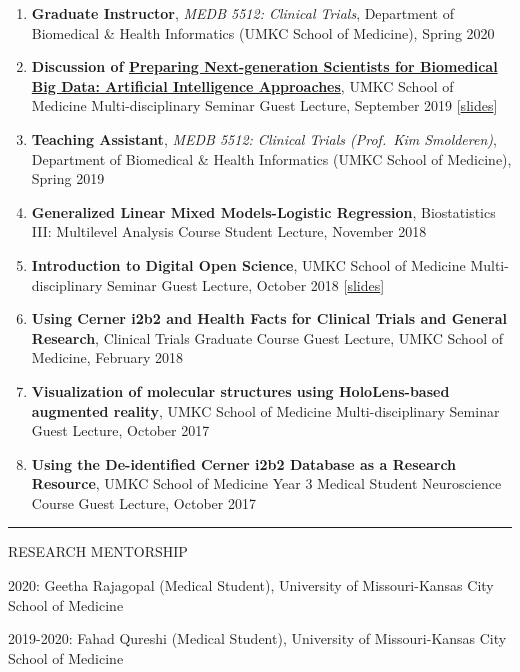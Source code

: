 \documentclass[
]{article}
\begin{document}
\begin{enumerate}
\def\labelenumi{\arabic{enumi}.}
\item
  \textbf{Graduate Instructor}, \emph{MEDB 5512: Clinical Trials},
  Department of Biomedical \& Health Informatics (UMKC School of
  Medicine), Spring 2020
\item
  \textbf{Discussion of
  \href{https://www.futuremedicine.com/doi/10.2217/pme-2018-0145}{Preparing
  Next-generation Scientists for Biomedical Big Data: Artificial
  Intelligence Approaches}}, UMKC School of Medicine Multi-disciplinary
  Seminar Guest Lecture, September 2019
  {[}\href{https://jeremyprovance.github.io/assets/2019-09-24_Slides.pdf}{slides}{]}
\item
  \textbf{Teaching Assistant}, \emph{MEDB 5512: Clinical Trials
  (Prof.~Kim Smolderen)}, Department of Biomedical \& Health Informatics
  (UMKC School of Medicine), Spring 2019
\item
  \textbf{Generalized Linear Mixed Models-Logistic Regression},
  Biostatistics III: Multilevel Analysis Course Student Lecture,
  November 2018
\item
  \textbf{Introduction to Digital Open Science}, UMKC School of Medicine
  Multi-disciplinary Seminar Guest Lecture, October 2018
  {[}\href{https://jeremyprovance.github.io/assets/2018-10-23_Slides.pdf}{slides}{]}
\item
  \textbf{Using Cerner i2b2 and Health Facts for Clinical Trials and
  General Research}, Clinical Trials Graduate Course Guest Lecture, UMKC
  School of Medicine, February 2018
\item
  \textbf{Visualization of molecular structures using HoloLens-based
  augmented reality}, UMKC School of Medicine Multi-disciplinary Seminar
  Guest Lecture, October 2017
\item
  \textbf{Using the De-identified Cerner i2b2 Database as a Research
  Resource}, UMKC School of Medicine Year 3 Medical Student Neuroscience
  Course Guest Lecture, October 2017
\end{enumerate}

\begin{center}\rule{0.5\linewidth}{0.5pt}\end{center}

RESEARCH MENTORSHIP

2020: Geetha Rajagopal (Medical Student), University of Missouri-Kansas
City School of Medicine

2019-2020: Fahad Qureshi (Medical Student), University of
Missouri-Kansas City School of Medicine
\end{document}
